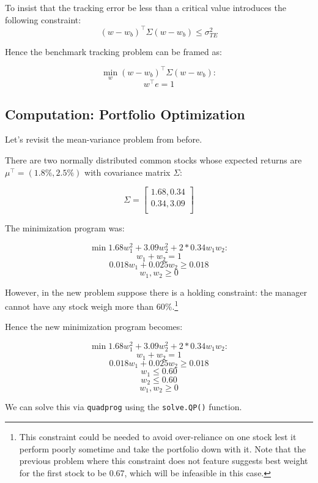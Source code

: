 \documentclass[11pt,]{article}
\let\rmarkdownfootnote\footnote%
\def\footnote{\protect\rmarkdownfootnote}
\begin{document}
To insist that the tracking error be less than a critical value
introduces the following constraint:
\[(w-w_b)^{\top}\Sigma(w-w_b)\leq \sigma^2_{TE}\]

Hence the benchmark tracking problem can be framed as:

\[\min_w{} (w-w_b)^{\top}\Sigma(w-w_b):\] \[w^{\top}e = 1 \]

\subsection{Computation: Portfolio
Optimization}\label{computation-portfolio-optimization}

Let's revisit the mean-variance problem from before.

There are two normally distributed common stocks whose expected returns
are \(\mu^{\top} = (1.8\%, 2.5\%)\) with covariance matrix \(\Sigma\):

\[\Sigma = 
\begin{bmatrix}
1.68, 0.34\\
0.34, 3.09\\
\end{bmatrix}
\]

The minimization program was:

\[\min{} 1.68w_1^2+3.09w_2^2+2*0.34w_1w_2:\] \[w_1+w_2=1\]
\[0.018w_1 + 0.025w_2 \geq 0.018\] \[w_1, w_2\geq 0\]

However, in the new problem suppose there is a holding constraint: the
manager cannot have any stock weigh more than 60\%.\footnote{This
  constraint could be needed to avoid over-reliance on one stock lest it
  perform poorly sometime and take the portfolio down with it. Note that
  the previous problem where this constraint does not feature suggests
  best weight for the first stock to be 0.67, which will be infeasible
  in this case.}

Hence the new minimization program becomes:

\[\min{} 1.68w_1^2+3.09w_2^2+2*0.34w_1w_2:\] \[w_1+w_2=1\]
\[0.018w_1 + 0.025w_2 \geq 0.018\] \[w_1\leq 0.60\] \[w_2\leq 0.60\]
\[w_1, w_2\geq 0\]

We can solve this via \texttt{quadprog} using the \texttt{solve.QP()}
function.
\end{document}

